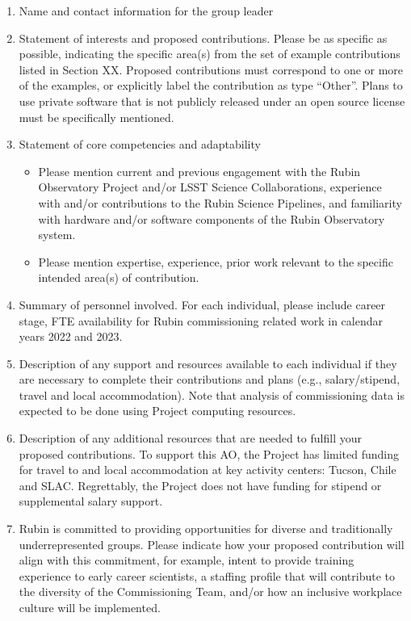 \documentclass[SE,authoryear,toc]{lsstdoc}
\begin{document}
\begin{enumerate}
\item Name and contact information for the group leader

\item Statement of interests and proposed contributions. Please be as specific as possible, indicating the specific area(s) from the set of example contributions listed in Section XX. Proposed contributions must correspond to one or more of the examples, or explicitly label the contribution as type ``Other''. Plans to use private software that is not publicly released under an open source license must be specifically mentioned.

\item Statement of core competencies and adaptability
\begin{itemize}
\item Please mention current and previous engagement with the Rubin Observatory Project and/or LSST Science Collaborations, experience with and/or contributions to the Rubin Science Pipelines, and familiarity with hardware and/or software components of the Rubin Observatory system.
\item Please mention expertise, experience, prior work relevant to the specific intended area(s) of contribution.
\end{itemize}

\item Summary of personnel involved. For each individual, please include career stage, FTE availability for Rubin commissioning related work in calendar years 2022 and 2023. 

\item Description of any support and resources available to each individual if they are necessary to complete their contributions and plans (e.g., salary/stipend, travel and local accommodation). Note that analysis of commissioning data is expected to be done using Project computing resources.

\item Description of any additional resources that are needed to fulfill your proposed contributions. To support this AO, the Project has limited funding for travel to and local accommodation at key activity centers: Tucson, Chile and SLAC.  Regrettably, the Project does not have funding for stipend or supplemental salary support.

\item Rubin is committed to providing opportunities for diverse and traditionally underrepresented groups. Please indicate how your proposed contribution will align with this commitment, for example, intent to provide training experience to early career scientists, a staffing profile that will contribute to the diversity of the Commissioning Team, and/or how an inclusive workplace culture will be implemented. 
\end{enumerate}
\end{document}
